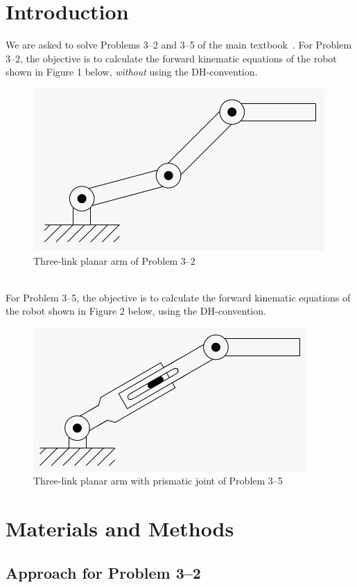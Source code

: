 \documentclass[conference]{IEEEtran}
\begin{document}
\section{Introduction}
We are asked to solve Problems 3--2 and 3--5 of the main textbook~\cite{Spong2006}.
For Problem 3--2, the objective is to calculate the forward kinematic equations
of the robot shown in Figure 1 below, \textit{without} using the DH-convention.\\
\begin{figure}[h]
    \includegraphics[scale=0.4]{prob3_2.png}
    \centering
    \caption{Three-link planar arm of Problem 3--2}
\end{figure}\\
For Problem 3--5, the objective is to calculate the forward kinematic equations
of the robot shown in Figure 2 below, using the DH-convention.
\begin{figure}[h]
    \includegraphics[scale=0.4]{prob3_5.png}
    \centering
    \caption{Three-link planar arm with prismatic joint of Problem 3--5}
\end{figure}

\section{Materials and Methods}

\subsection{Approach for Problem 3--2}
\end{document}
